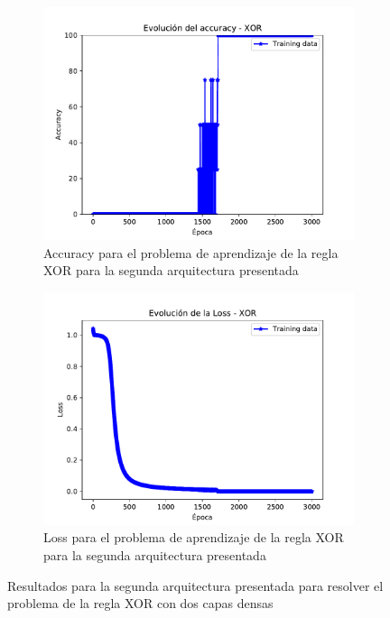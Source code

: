 \begin{figure}[H]
     \centering
     \begin{subfigure}[b]{0.45\textwidth}
         \centering
         \includegraphics[width=\textwidth]{image/TP2_6_acc_b.pdf}
         \caption{Accuracy para el problema de aprendizaje de la regla XOR para la segunda arquitectura presentada}
         \label{fig:acc6a}
     \end{subfigure}
     \hfill
     \begin{subfigure}[b]{0.45\textwidth}
         \centering
         \includegraphics[width=\textwidth]{image/TP2_6_Loss_b.pdf}
         \caption{Loss para el problema de aprendizaje de la regla XOR para la segunda arquitectura presentada}
         \label{fig:loss6a}
     \end{subfigure}
        \caption{Resultados para la segunda arquitectura presentada para resolver el problema de la regla XOR con dos capas densas}
        \label{fig:resu6a}
\end{figure}

